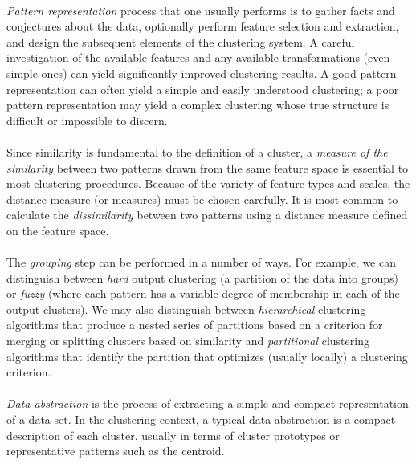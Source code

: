\documentclass[10pt]{article}\usepackage[]{graphicx}\usepackage[]{color}
\begin{document}
\paragraph{}
\textit{Pattern representation} process that one usually performs is to gather facts 
and conjectures
about the data, optionally perform feature selection and extraction, and design
the subsequent elements of the clustering system. A careful investigation
of the available features and any available transformations (even
simple ones) can yield significantly improved clustering results. A good pattern
representation can often yield a simple and easily understood clustering;
a poor pattern representation may yield a complex clustering whose true structure
is difficult or impossible to discern.
\paragraph{}
Since similarity is fundamental to the definition of a cluster, a \textit{measure of the
similarity} between two patterns drawn from the same feature space is essential
to most clustering procedures. Because of the variety of feature types and
scales, the distance measure (or measures) must be chosen carefully. It is
most common to calculate the \textit{dissimilarity} between two patterns using a distance
measure defined on the feature space. 
\paragraph{}
The \textit{grouping} step can be performed in a number of ways. For example, we can 
distinguish between \textit{hard} output clustering (a partition of the data into groups) or
\textit{fuzzy} (where each pattern has a variable degree of membership in each of
the output clusters). 
We may also distinguish between \textit{hierarchical} clustering algorithms that 
produce a nested series of partitions based on a criterion for
merging or splitting clusters based on similarity and \textit{partitional} clustering algorithms
that identify the partition that optimizes (usually locally) a clustering criterion.
\paragraph{}
\textit{Data abstraction} is the process of extracting a simple and compact representation
of a data set. In the clustering context, a typical data abstraction is a
compact description of each cluster, usually in terms of cluster prototypes or
representative patterns such as the centroid.
\end{document}
